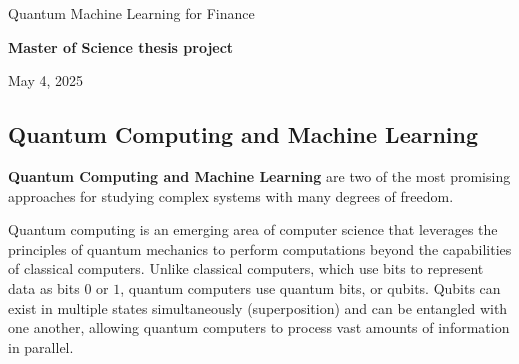 \documentclass[%
oneside,                 %
final,                   %
10pt]{article}
\begin{document}

\newcommand{\exercisesection}[1]{\subsection*{#1}}






\thispagestyle{empty}

\begin{center}
{\LARGE\bf
\begin{spacing}{1.25}
Quantum Machine Learning for Finance
\end{spacing}
}
\end{center}


\begin{center}
{\bf Master of Science thesis project${}^{}$} \\ [0mm]
\end{center}

\begin{center}
\end{center}
    

\begin{center}
May 4, 2025
\end{center}

\vspace{1cm}


\subsection*{Quantum Computing and Machine Learning}

\textbf{Quantum Computing and Machine Learning} are two of the most promising
approaches for studying complex systems with many degrees of freedom.

Quantum computing is an emerging area of computer science that
leverages the principles of quantum mechanics to perform computations
beyond the capabilities of classical computers. Unlike classical
computers, which use bits to represent data as bits $0$ or $1$, quantum
computers use quantum bits, or qubits. Qubits can exist in multiple
states simultaneously (superposition) and can be entangled with one
another, allowing quantum computers to process vast amounts of
information in parallel.
\end{document}
